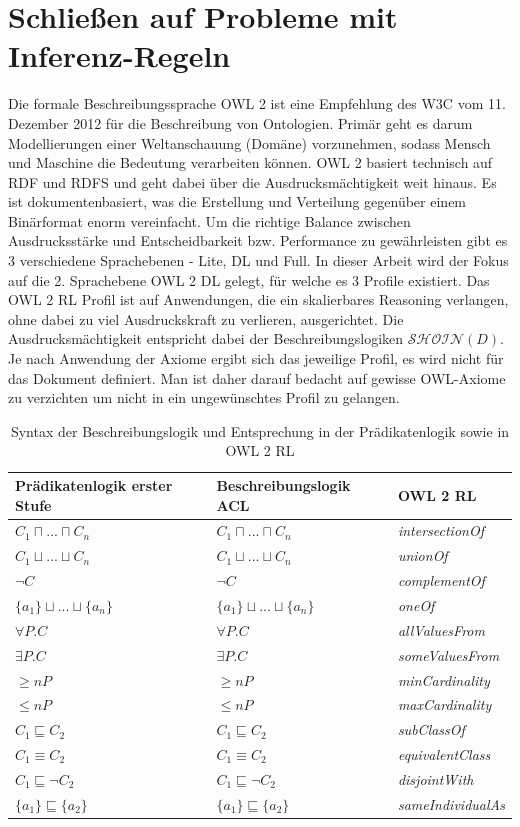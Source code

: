 \documentclass[runningheads,a4paper]{llncs}
\begin{document}
\section{Schließen auf Probleme mit Inferenz-Regeln}
Die formale Beschreibungssprache OWL 2 ist eine Empfehlung des W3C vom 11. Dezember 2012 für die Beschreibung von Ontologien. 
Primär geht es darum Modellierungen einer Weltanschauung (Domäne) vorzunehmen, sodass Mensch und Maschine die Bedeutung verarbeiten können. 
OWL 2 basiert technisch auf RDF und RDFS und geht dabei über die Ausdrucksmächtigkeit weit hinaus. 
Es ist dokumentenbasiert, was die Erstellung und Verteilung gegenüber einem Binärformat enorm vereinfacht. 
Um die richtige Balance zwischen Ausdrucksstärke und Entscheidbarkeit bzw. Performance zu gewährleisten gibt es 3 verschiedene Sprachebenen - Lite, DL und Full. 
In dieser Arbeit wird der Fokus auf die 2. Sprachebene OWL 2 DL gelegt, für welche es 3 Profile existiert. 
Das OWL 2 RL Profil ist auf Anwendungen, die ein skalierbares Reasoning verlangen, ohne dabei zu viel Ausdruckskraft zu verlieren, ausgerichtet. 
Die Ausdrucksmächtigkeit entspricht dabei der Beschreibungslogiken \(\mathcal{SHOIN}(D)\). 
Je nach Anwendung der Axiome ergibt sich das jeweilige Profil, es wird nicht für das Dokument definiert. 
Man ist daher darauf bedacht auf gewisse OWL-Axiome zu verzichten um nicht in ein ungewünschtes Profil zu gelangen.
\begin{table}[h]
\begin{tabular}{|l|l|l|}
\hline
Prädikatenlogik erster Stufe & Beschreibungslogik ACL & OWL 2 RL \\ \hline
$ C_1 \sqcap ... \sqcap C_n $ & $ C_1 \sqcap ... \sqcap C_n $ & \textit{intersectionOf} \\ \hline
$ C_1 \sqcup ... \sqcup C_n $ & $ C_1 \sqcup ... \sqcup C_n $ & \textit{unionOf} \\ \hline
$ \neg C $ & $ \neg C $ & \textit{complementOf} \\ \hline
$ \{a_1\} \sqcup ... \sqcup \{a_n\} $ & $ \{a_1\} \sqcup ... \sqcup \{a_n\} $ & \textit{oneOf} \\ \hline
$ \forall P.C $ & $ \forall P.C $ & \textit{allValuesFrom} \\ \hline
$ \exists P.C $ & $ \exists P.C $ & \textit{someValuesFrom} \\ \hline
$ \geq n P $ & $ \geq n P $ & \textit{minCardinality} \\ \hline
$ \leq n P $ & $ \leq n P $ & \textit{maxCardinality} \\ \hline
$ C_1 \sqsubseteq C_2 $ & $ C_1 \sqsubseteq C_2 $ & \textit{subClassOf} \\ \hline
$ C_1 \equiv C_2 $ & $ C_1 \equiv C_2 $ & \textit{equivalentClass} \\ \hline
$ C_1 \sqsubseteq \neg C_2 $ & $ C_1 \sqsubseteq \neg C_2 $ & \textit{disjointWith} \\ \hline
$ \{a_1\} \sqsubseteq \{a_2\} $ & $ \{a_1\} \sqsubseteq \{a_2\} $ & \textit{sameIndividualAs} \\ \hline
\end{tabular}
\label{table:description_logic}
\caption{Syntax der Beschreibungslogik und Entsprechung in der Prädikatenlogik sowie in OWL 2 RL}
\end{table}
\end{document}
